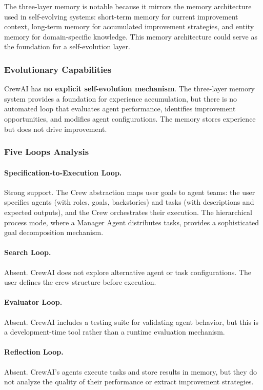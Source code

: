 The three-layer memory is notable because it mirrors the memory architecture used in self-evolving systems: short-term memory for current improvement context, long-term memory for accumulated improvement strategies, and entity memory for domain-specific knowledge. This memory architecture could serve as the foundation for a self-evolution layer.

\subsubsection{Evolutionary Capabilities}

CrewAI has \textbf{no explicit self-evolution mechanism}. The three-layer memory system provides a foundation for experience accumulation, but there is no automated loop that evaluates agent performance, identifies improvement opportunities, and modifies agent configurations. The memory stores experience but does not drive improvement.

\subsubsection{Five Loops Analysis}

\paragraph{Specification-to-Execution Loop.}
Strong support. The Crew abstraction maps user goals to agent teams: the user specifies agents (with roles, goals, backstories) and tasks (with descriptions and expected outputs), and the Crew orchestrates their execution. The hierarchical process mode, where a Manager Agent distributes tasks, provides a sophisticated goal decomposition mechanism.

\paragraph{Search Loop.}
Absent. CrewAI does not explore alternative agent or task configurations. The user defines the crew structure before execution.

\paragraph{Evaluator Loop.}
Absent. CrewAI includes a testing suite for validating agent behavior, but this is a development-time tool rather than a runtime evaluation mechanism.

\paragraph{Reflection Loop.}
Absent. CrewAI's agents execute tasks and store results in memory, but they do not analyze the quality of their performance or extract improvement strategies.

